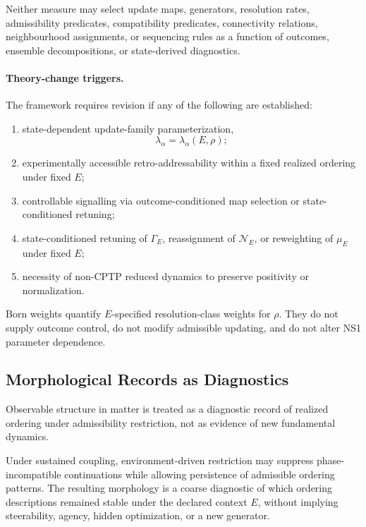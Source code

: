 \documentclass[aps,prx,onecolumn,11pt]{revtex4-2}
\theoremstyle{plain}
\theoremstyle{definition}
\theoremstyle{remark}
\begin{document}
Neither measure may select update maps, generators, resolution rates,
admissibility predicates, compatibility predicates, connectivity
relations, neighbourhood assignments, or sequencing rules as a function
of outcomes, ensemble decompositions, or state-derived diagnostics.

\paragraph{Theory-change triggers.}

The framework requires revision if any of the following are established:

\begin{enumerate}[label=(\roman*), leftmargin=2.2em]

\item state-dependent update-family parameterization,
\[
\lambda_\alpha=\lambda_\alpha(E,\rho);
\]

\item experimentally accessible retro-addressability within a fixed
realized ordering under fixed \(E\);

\item controllable signalling via outcome-conditioned map selection or
state-conditioned retuning;

\item state-conditioned retuning of \(\Gamma_E\), reassignment of
\(\mathcal N_E\), or reweighting of \(\mu_E\) under fixed \(E\);

\item necessity of non-CPTP reduced dynamics to preserve positivity or
normalization.

\end{enumerate}

Born weights quantify \(E\)-specified resolution-class weights for
\(\rho\). They do not supply outcome control, do not modify admissible
updating, and do not alter NS1 parameter dependence.

\subsection{Morphological Records as Diagnostics}
\label{appA:morphological_records_diagnostics}

Observable structure in matter is treated as a diagnostic record of
realized ordering under admissibility restriction, not as evidence of
new fundamental dynamics.

Under sustained coupling, environment-driven restriction may suppress
phase-incompatible continuations while allowing persistence of
admissible ordering patterns. The resulting morphology is a coarse
diagnostic of which ordering descriptions remained stable under the
declared context \(E\), without implying steerability, agency, hidden
optimization, or a new generator.
\end{document}
